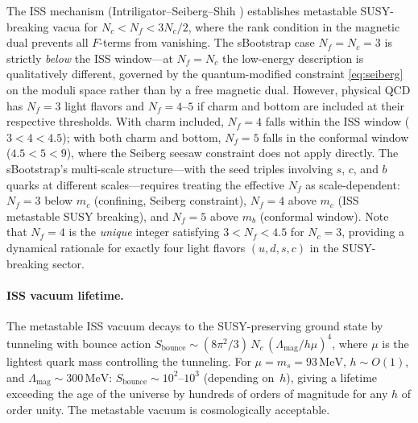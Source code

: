 \documentclass[12pt,a4paper]{article}
\newcommand{\MeV}{\,\text{MeV}}
\begin{document}
The ISS mechanism (Intriligator--Seiberg--Shih \cite{ISS2006}) 
establishes metastable SUSY-breaking vacua for $N_c < N_f < 3N_c/2$, 
where the rank condition in the magnetic dual prevents all $F$-terms 
from vanishing. The sBootstrap case $N_f = N_c = 3$ is strictly 
\emph{below} the ISS window---at $N_f = N_c$ the low-energy 
description is qualitatively different, governed by the 
quantum-modified constraint \eqref{eq:seiberg} on the moduli space 
rather than by a free magnetic dual. However, physical QCD has
$N_f = 3$ light flavors and $N_f = 4$--$5$ if charm and bottom are
included at their respective thresholds. With charm included,
$N_f = 4$ falls within the ISS window ($3 < 4 < 4.5$); with both
charm and bottom, $N_f = 5$ falls in the conformal window
($4.5 < 5 < 9$), where the Seiberg seesaw constraint does not apply
directly. The sBootstrap's multi-scale structure---with
the seed triples involving $s$, $c$, and $b$ quarks at different
scales---requires treating the effective $N_f$ as
scale-dependent: $N_f = 3$ below $m_c$ (confining, Seiberg
constraint), $N_f = 4$ above $m_c$ (ISS metastable SUSY breaking),
and $N_f = 5$ above $m_b$ (conformal window).
Note that $N_f = 4$ is the \emph{unique} integer satisfying
$3 < N_f < 4.5$ for $N_c = 3$, providing a dynamical rationale for
exactly four light flavors $(u,d,s,c)$ in the SUSY-breaking sector.

\paragraph{ISS vacuum lifetime.}
The metastable ISS vacuum decays to the SUSY-preserving ground state
by tunneling with bounce action
$S_{\text{bounce}} \sim (8\pi^2/3)\,N_c\,(\Lambda_{\text{mag}}/h\mu)^4$,
where $\mu$ is the lightest quark mass controlling the tunneling.
For $\mu = m_s = 93\MeV$, $h \sim O(1)$, and
$\Lambda_{\text{mag}} \sim 300\MeV$:
$S_{\text{bounce}} \sim 10^2$--$10^3$ (depending on~$h$),
giving a lifetime exceeding the age of the universe by hundreds of
orders of magnitude for any $h$ of order unity.
The metastable vacuum is cosmologically acceptable.
\end{document}

